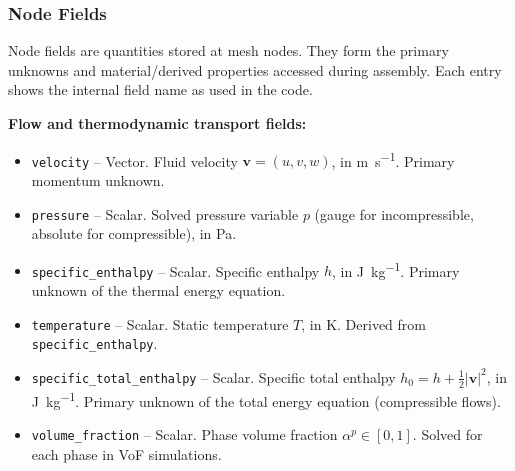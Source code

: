 \documentclass[12pt]{extarticle}
\newcommand{\<}{\langle}
\renewcommand{\>}{\rangle}
\theoremstyle{definition}
\begin{document}
\subsubsection{Node Fields}

Node fields are quantities stored at mesh nodes. They form the primary unknowns and material/derived properties accessed during assembly. Each entry shows the internal field name as used in the code.

\medskip
\noindent\textbf{Flow and thermodynamic transport fields:}
\begin{itemize}
    \item \texttt{velocity} -- Vector. Fluid velocity $\textbf{v} = (u,v,w)$, in \si{\metre\per\second}. Primary momentum unknown.
    \item \texttt{pressure} -- Scalar. Solved pressure variable $p$ (gauge for incompressible, absolute for compressible), in \si{\pascal}.
    \item \texttt{specific\_enthalpy} -- Scalar. Specific enthalpy $h$, in \si{\joule\per\kilogram}. Primary unknown of the thermal energy equation.
    \item \texttt{temperature} -- Scalar. Static temperature $T$, in \si{\kelvin}. Derived from \texttt{specific\_enthalpy}.
    \item \texttt{specific\_total\_enthalpy} -- Scalar. Specific total enthalpy $h_0 = h + \tfrac{1}{2}|\textbf{v}|^2$, in \si{\joule\per\kilogram}. Primary unknown of the total energy equation (compressible flows).
    \item \texttt{volume\_fraction} -- Scalar. Phase volume fraction $\alpha^p \in [0,1]$. Solved for each phase in VoF simulations.
\end{itemize}
\end{document}
